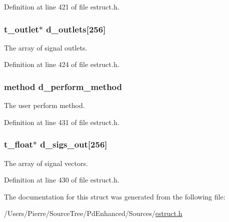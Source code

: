 Definition at line 421 of file estruct.\-h.

\hypertarget{struct__edspobj_a529a1e3597eb3ee79f6cabef51f41ef9}{
\subsubsection[{d\-\_\-outlets}]{\setlength{\rightskip}{0pt plus 5cm}t\-\_\-outlet$\ast$ d\-\_\-outlets\mbox{[}256\mbox{]}}}\label{struct__edspobj_a529a1e3597eb3ee79f6cabef51f41ef9}
The array of signal outlets. 

Definition at line 424 of file estruct.\-h.

\hypertarget{struct__edspobj_ae13acca7c0f073f1030545ce368e6e03}{
\subsubsection[{d\-\_\-perform\-\_\-method}]{\setlength{\rightskip}{0pt plus 5cm}method d\-\_\-perform\-\_\-method}}\label{struct__edspobj_ae13acca7c0f073f1030545ce368e6e03}
The user perform method. 

Definition at line 431 of file estruct.\-h.

\hypertarget{struct__edspobj_aebb3e36050cca90ec2bbfc8226198ca8}{
\subsubsection[{d\-\_\-sigs\-\_\-out}]{\setlength{\rightskip}{0pt plus 5cm}t\-\_\-float$\ast$ d\-\_\-sigs\-\_\-out\mbox{[}256\mbox{]}}}\label{struct__edspobj_aebb3e36050cca90ec2bbfc8226198ca8}
The array of signal vectors. 

Definition at line 430 of file estruct.\-h.



The documentation for this struct was generated from the following file\-:\begin{DoxyCompactItemize}
\item 
/\-Users/\-Pierre/\-Source\-Tree/\-Pd\-Enhanced/\-Sources/\hyperlink{estruct_8h}{estruct.\-h}\end{DoxyCompactItemize}
